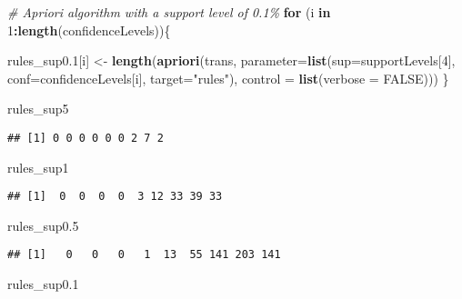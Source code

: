 \documentclass[
]{article}
\newenvironment{Shaded}{\begin{snugshade}}{\end{snugshade}}
\newcommand{\AttributeTok}[1]{\textcolor[rgb]{0.13,0.29,0.53}{#1}}
\newcommand{\CommentTok}[1]{\textcolor[rgb]{0.56,0.35,0.01}{\textit{#1}}}
\newcommand{\ConstantTok}[1]{\textcolor[rgb]{0.56,0.35,0.01}{#1}}
\newcommand{\ControlFlowTok}[1]{\textcolor[rgb]{0.13,0.29,0.53}{\textbf{#1}}}
\newcommand{\DecValTok}[1]{\textcolor[rgb]{0.00,0.00,0.81}{#1}}
\newcommand{\FloatTok}[1]{\textcolor[rgb]{0.00,0.00,0.81}{#1}}
\newcommand{\FunctionTok}[1]{\textcolor[rgb]{0.13,0.29,0.53}{\textbf{#1}}}
\newcommand{\NormalTok}[1]{#1}
\newcommand{\OtherTok}[1]{\textcolor[rgb]{0.56,0.35,0.01}{#1}}
\newcommand{\SpecialCharTok}[1]{\textcolor[rgb]{0.81,0.36,0.00}{\textbf{#1}}}
\newcommand{\StringTok}[1]{\textcolor[rgb]{0.31,0.60,0.02}{#1}}
\begin{document}
\begin{Shaded}
\begin{Highlighting}[]
\CommentTok{\# Apriori algorithm with a support level of 0.1\%}
\ControlFlowTok{for}\NormalTok{ (i }\ControlFlowTok{in} \DecValTok{1}\SpecialCharTok{:}\FunctionTok{length}\NormalTok{(confidenceLevels))\{}
  
\NormalTok{  rules\_sup0}\FloatTok{.1}\NormalTok{[i] }\OtherTok{\textless{}{-}} \FunctionTok{length}\NormalTok{(}\FunctionTok{apriori}\NormalTok{(trans, }\AttributeTok{parameter=}\FunctionTok{list}\NormalTok{(}\AttributeTok{sup=}\NormalTok{supportLevels[}\DecValTok{4}\NormalTok{], }
                                                          \AttributeTok{conf=}\NormalTok{confidenceLevels[i], }\AttributeTok{target=}\StringTok{"rules"}\NormalTok{), }
                                \AttributeTok{control =} \FunctionTok{list}\NormalTok{(}\AttributeTok{verbose =} \ConstantTok{FALSE}\NormalTok{)))}
\NormalTok{\}}
\end{Highlighting}
\end{Shaded}

\begin{Shaded}
\begin{Highlighting}[]
\NormalTok{rules\_sup5 }
\end{Highlighting}
\end{Shaded}

\begin{verbatim}
## [1] 0 0 0 0 0 0 2 7 2
\end{verbatim}

\begin{Shaded}
\begin{Highlighting}[]
\NormalTok{rules\_sup1 }
\end{Highlighting}
\end{Shaded}

\begin{verbatim}
## [1]  0  0  0  0  3 12 33 39 33
\end{verbatim}

\begin{Shaded}
\begin{Highlighting}[]
\NormalTok{rules\_sup0}\FloatTok{.5} 
\end{Highlighting}
\end{Shaded}

\begin{verbatim}
## [1]   0   0   0   1  13  55 141 203 141
\end{verbatim}

\begin{Shaded}
\begin{Highlighting}[]
\NormalTok{rules\_sup0}\FloatTok{.1}
\end{Highlighting}
\end{Shaded}
\end{document}
